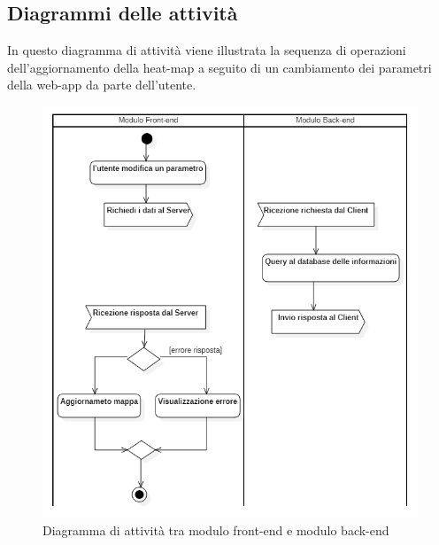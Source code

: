 \subsection{Diagrammi delle attività}\label{DiagrammaDelleAttivita}
In questo diagramma di attività viene illustrata la sequenza di operazioni dell'aggiornamento della heat-map a seguito di un cambiamento dei parametri della web-app da parte dell'utente.
\begin{center}
	\begin{figure}[H]
		\centering\includegraphics[scale=0.8]{../immagini/diag_PB/diag_act_front_back.png}
		\caption{Diagramma di attività tra modulo front-end e modulo back-end}
	\end{figure}
\end{center}
